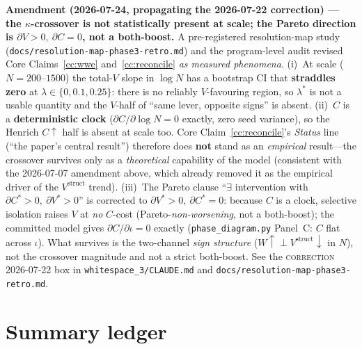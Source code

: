 \documentclass[11pt,letterpaper]{article}
\theoremstyle{definition}
\theoremstyle{plain}
\begin{document}
\medskip\noindent\textbf{Amendment (2026-07-24, propagating the 2026-07-22
correction) --- the $\kappa$-crossover is not statistically present at scale; the
Pareto direction is $\partial V>0,\ \partial C=0$, not a both-boost.} A pre-registered
resolution-map study (\texttt{docs/resolution-map-phase3-retro.md}) and the
program-level audit revised Core Claims~\ref{cc:wwe} and~\ref{cc:reconcile} \emph{as
measured phenomena}. (i)~At scale ($N{=}200$--$1500$) the total-$V$ slope in $\log N$
has a bootstrap CI that \textbf{straddles zero} at $\lambda\in\{0,0.1,0.25\}$: there is
no reliably $V$-favouring region, so $\lambda^\ast$ is not a usable quantity and the
$V$-half of ``same lever, opposite signs'' is absent. (ii)~$C$ is a \textbf{deterministic
clock} ($\partial C/\partial\log N = 0$ exactly, zero seed variance), so the Henrich
$C\!\uparrow$ half is absent at scale too. Core Claim~\ref{cc:reconcile}'s \emph{Status}
line (``the paper's central result'') therefore does \textbf{not} stand as an
\emph{empirical} result---the crossover survives only as a \emph{theoretical} capability
of the model (consistent with the 2026-07-07 amendment above, which already removed it as
the empirical driver of the $V^{\mathrm{struct}}$ trend). (iii)~The Pareto clause
``$\exists$ intervention with $\partial C^\ast>0,\ \partial V^\ast>0$'' is corrected to
$\partial V^\ast>0,\ \partial C^\ast=0$: because $C$ is a clock, selective isolation raises
$V$ at \emph{no} $C$-cost (Pareto-\emph{non-worsening}, not a both-boost); the committed
model gives $\partial C/\partial\iota=0$ exactly (\texttt{phase\_diagram.py} Panel~C:
$C$ flat across $\iota$). What survives is the two-channel \emph{sign structure}
($W\!\uparrow \perp V^{\mathrm{struct}}\!\downarrow$ in $N$), not the crossover magnitude
and not a strict both-boost. See the \textsc{correction 2026-07-22} box in
\texttt{whitespace\_3/CLAUDE.md} and \texttt{docs/resolution-map-phase3-retro.md}.

\section{Summary ledger}
\end{document}
